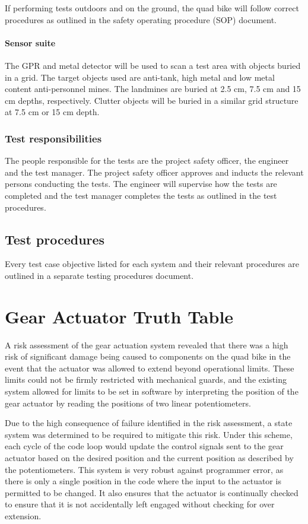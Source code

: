 \documentclass[main.tex]{subfiles}
\begin{document}
\begin{appendices}
If performing tests outdoors and on the ground, the quad bike will follow correct procedures as outlined in the safety operating procedure (SOP) document. 

\subsubsection{Sensor suite}
The GPR and metal detector will be used to scan a test area with objects buried in a grid. The target objects used are anti-tank, high metal and low metal content anti-personnel mines. The landmines are buried at 2.5 cm, 7.5 cm and 15 cm depths,  respectively. Clutter objects will be buried in a similar grid structure at 7.5 cm or 15 cm depth.

\subsection{Test responsibilities}
The people responsible for the tests are the project safety officer, the engineer and the test manager. The project safety officer approves and inducts the relevant persons conducting the tests. The engineer will supervise how the tests are completed and the test manager completes the tests as outlined in the test procedures.  

\section{Test procedures}
Every test case objective listed for each system and their relevant procedures are outlined in a separate testing procedures document.


\chapter{Gear Actuator Truth Table}

A risk assessment of the gear actuation system revealed that there was a high risk of significant damage being caused to components on the quad bike in the event that the actuator was allowed to extend beyond operational limits. These limits could not be firmly restricted with mechanical guards, and the existing system allowed for limits to be set in software by interpreting the position of the gear actuator by reading the positions of two linear potentiometers. 

Due to the high consequence of failure identified in the risk assessment, a state system was determined to be required to mitigate this risk. Under this scheme, each cycle of the code loop would update the control signals sent to the gear actuator based on the desired position and the current position as described by the potentiometers. This system is very robust against programmer error, as there is only a single position in the code where the input to the actuator is permitted to be changed. It also ensures that the actuator is continually checked to ensure that it is not accidentally left engaged without checking for over extension.


\end{appendices}
\end{document}
